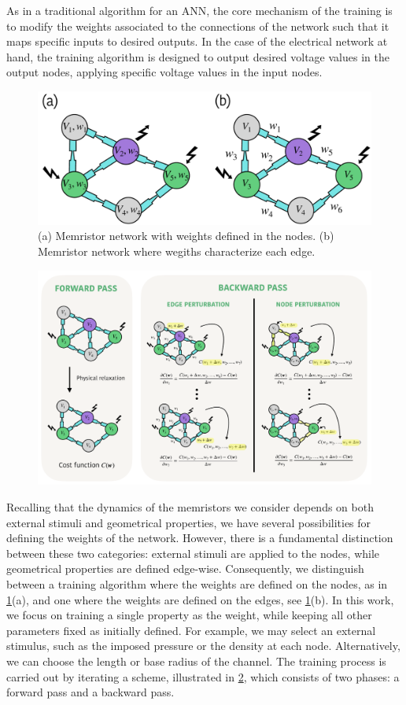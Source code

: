 \documentclass[reprint,superscriptaddress,prb,showkeys]{revtex4-2}
\begin{document}
As in a traditional algorithm for an ANN, the core mechanism of the training is to modify the weights associated to the connections of the network such that it maps specific inputs to desired outputs. In the case of the electrical network at hand, the training algorithm is designed to output desired voltage values in the output nodes, applying specific voltage values in the input nodes.
\begin{figure}[!h]
    \centering
    \includegraphics[width=0.8\columnwidth]{plots/training/two_types_weights.pdf}
    \caption{(a) Memristor network with weights defined in the nodes. (b) Memristor network where wegiths characterize each edge.}
    \label{fig:two_types_weights}
\end{figure} 
\begin{figure}[t] 
    \centering
    \includegraphics[width=\textwidth]{plots/training/training_scheme.pdf}
    \caption{}
    \label{fig:training_scheme}
\end{figure}
Recalling that the dynamics of the memristors we consider depends on both external stimuli and geometrical properties, we have several possibilities for defining the weights of the network. However, there is a fundamental distinction between these two categories: external stimuli are applied to the nodes, while geometrical properties are defined edge-wise. Consequently, we distinguish between a training algorithm where the weights are defined on the nodes, as in \cref{fig:two_types_weights}(a), and one where the weights are defined on the edges, see \cref{fig:two_types_weights}(b). In this work, we focus on training a single property as the weight, while keeping all other parameters fixed as initially defined. For example, we may select an external stimulus, such as the imposed pressure or the density at each node. Alternatively, we can choose the length or base radius of the channel. The training process is carried out by iterating a scheme, illustrated in \cref{fig:training_scheme}, which consists of two phases: a forward pass and a backward pass.
\end{document}
